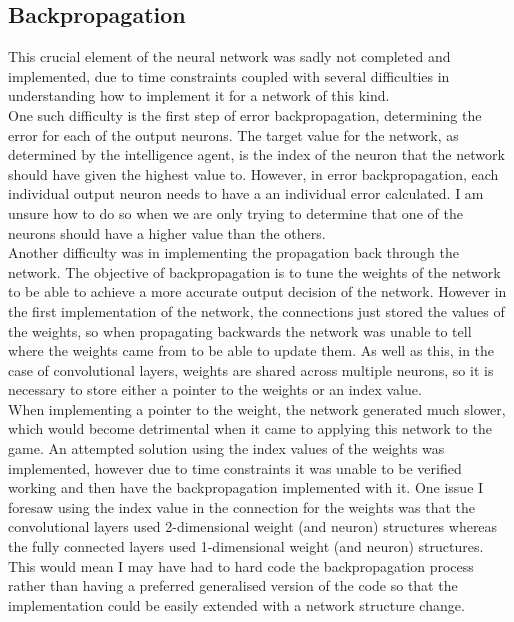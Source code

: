 \documentclass[10pt]{article}
\begin{document}
	\subsection{Backpropagation}
		This crucial element of the neural network was sadly not completed and implemented, due to time constraints coupled with several difficulties in understanding how to implement it for a network of this kind.\\		
		
		One such difficulty is the first step of error backpropagation, determining the error for each of the output neurons. The target value for the network, as determined by the intelligence agent, is the index of the neuron that the network should have given the highest value to. However, in error backpropagation, each individual output neuron needs to have a an individual error calculated. I am unsure how to do so when we are only trying to determine that one of the neurons should have a higher value than the others.\\
		
		Another difficulty was in implementing the propagation back through the network. The objective of backpropagation is to tune the weights of the network to be able to achieve a more accurate output decision of the network. However in the first implementation of the network, the connections just stored the values of the weights, so when propagating backwards the network was unable to tell where the weights came from to be able to update them. As well as this, in the case of convolutional layers, weights are shared across multiple neurons, so it is necessary to store either a pointer to the weights or an index value.\\
		
		When implementing a pointer to the weight, the network generated much slower, which would become detrimental when it came to applying this network to the game. An attempted solution using the index values of the weights was implemented, however due to time constraints it was unable to be verified working and then have the backpropagation implemented with it. One issue I foresaw using the index value in the connection for the weights was that the convolutional layers used 2-dimensional weight (and neuron) structures whereas the fully connected layers used 1-dimensional weight (and neuron) structures. This would mean I may have had to hard code the backpropagation process rather than having a preferred generalised version of the code so that the implementation could be easily extended with a network structure change.\\
\end{document}
